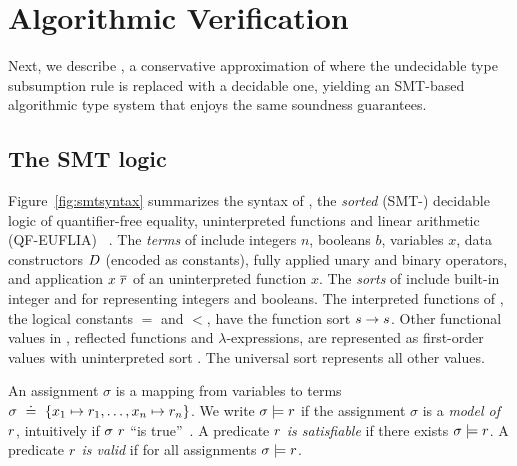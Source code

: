 \section{Algorithmic Verification}\label{sec:algorithmic}

Next, we describe \smtlan, a conservative approximation
of \corelan where the undecidable type subsumption rule
is replaced with a decidable one, yielding an SMT-based
algorithmic type system that enjoys the same soundness
guarantees.

\subsection{The SMT logic \smtlan}



%
Figure~\ref{fig:smtsyntax} summarizes the syntax
of \smtlan, the \emph{sorted} (SMT-)
decidable logic of quantifier-free equality,
uninterpreted functions and linear
arithmetic (QF-EUFLIA) ~\citep{Nelson81,SMTLIB2}.
%
The \emph{terms} of \smtlan include
integers $n$,
booleans $b$,
variables $x$,
data constructors $D$ (encoded as constants),
fully applied unary \unop and binary \binop operators,
and application $x\ \overline{r}$ of an uninterpreted function $x$.
%
The \emph{sorts} of \smtlan include built-in
integer \tint and \tbool for representing
integers and booleans.
%
The interpreted functions of \smtlan, \eg
the logical constants $=$ and $<$,
have the function sort $s \rightarrow s$.
%
Other functional values in \corelan, \eg
reflected \corelan functions and
$\lambda$-expressions, are represented as
first-order values with
uninterpreted sort \tsmtfun{\sort}{\sort}.
%
The universal sort \tuniv represents all other values.

%
An assignment $\sigma$ is a mapping from
variables to terms
%
${\sigma \defeq \{ \assignto{x_1}{\pred_1}, \ldots, \assignto{x_n}{\pred_n} \}}$.
%
We write
%
${\sigma \models r}$
%
if the assignment $\sigma$ is a
\emph{model of} $r$, intuitively
if $\sigma\ r$ ``is true''~\cite{Nelson81}.
%
A predicate $r$ \emph{is satisfiable} if
there exists ${\sigma\models r}$.
%
A predicate $r$ \emph{is valid} if
for all assignments ${\sigma\models r}$.


